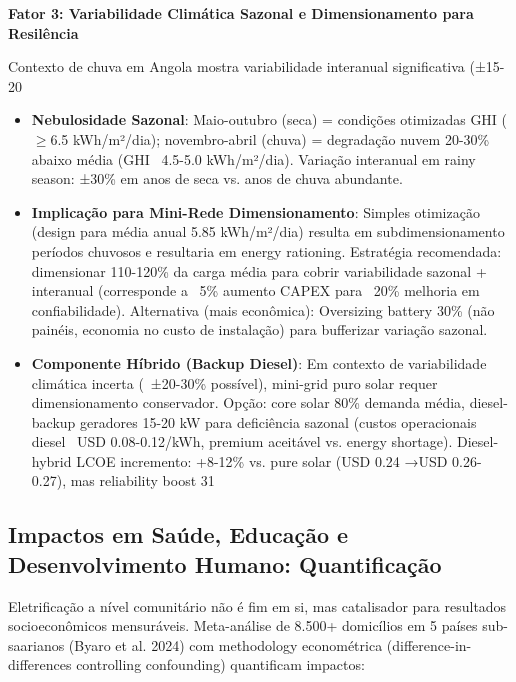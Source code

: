 \documentclass[12pt, a4paper]{article}
\begin{document}
\textbf{Fator 3: Variabilidade Climática Sazonal e Dimensionamento para Resilência}

Contexto de chuva em Angola mostra variabilidade interanual significativa (±15-20%

\begin{itemize}
\item \textbf{Nebulosidade Sazonal}: Maio-outubro (seca) = condições otimizadas GHI ($\geq$6.5 kWh/m²/dia); novembro-abril (chuva) = degradação nuvem 20-30\% abaixo média (GHI ~4.5-5.0 kWh/m²/dia). Variação interanual em rainy season: ±30\% em anos de seca vs. anos de chuva abundante.
\item \textbf{Implicação para Mini-Rede Dimensionamento}: Simples otimização (design para média anual 5.85 kWh/m²/dia) resulta em subdimensionamento períodos chuvosos e resultaria em energy rationing. Estratégia recomendada: dimensionar 110-120\% da carga média para cobrir variabilidade sazonal + interanual (corresponde a ~5\% aumento CAPEX para ~20\% melhoria em confiabilidade). Alternativa (mais econômica): Oversizing battery 30\% (não painéis, economia no custo de instalação) para bufferizar variação sazonal.
\item \textbf{Componente Híbrido (Backup Diesel)}: Em contexto de variabilidade climática incerta (~±20-30\% possível), mini-grid puro solar requer dimensionamento conservador. Opção: core solar 80\% demanda média, diesel-backup geradores 15-20 kW para deficiência sazonal (custos operacionais diesel ~USD 0.08-0.12/kWh, premium aceitável vs. energy shortage). Diesel-hybrid LCOE incremento: +8-12\% vs. pure solar (USD 0.24 →USD 0.26-0.27), mas reliability boost 31%
\end{itemize}

\subsection{Impactos em Saúde, Educação e Desenvolvimento Humano: Quantificação}

Eletrificação a nível comunitário não é fim em si, mas catalisador para resultados socioeconômicos mensuráveis. Meta-análise de 8.500+ domicílios em 5 países sub-saarianos (Byaro et al. 2024) com methodology econométrica (difference-in-differences controlling confounding) quantificam impactos:
\end{document}

